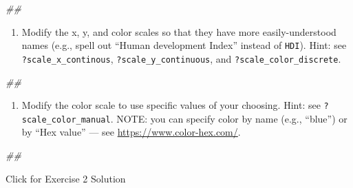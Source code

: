 \documentclass[
]{book}
\newenvironment{Shaded}{\begin{snugshade}}{\end{snugshade}}
\newcommand{\CommentTok}[1]{\textcolor[rgb]{0.56,0.35,0.01}{\textit{#1}}}
\providecommand{\tightlist}{%
  \setlength{\itemsep}{0pt}\setlength{\parskip}{0pt}}
\begin{document}
\begin{Shaded}
\begin{Highlighting}[]
\CommentTok{\#\# }
\end{Highlighting}
\end{Shaded}

\begin{enumerate}
\def\labelenumi{\arabic{enumi}.}
\setcounter{enumi}{1}
\tightlist
\item
  Modify the x, y, and color scales so that they have more easily-understood names (e.g., spell out ``Human development Index'' instead of \texttt{HDI}). Hint: see \texttt{?scale\_x\_continous}, \texttt{?scale\_y\_continuous}, and \texttt{?scale\_color\_discrete}.
\end{enumerate}

\begin{Shaded}
\begin{Highlighting}[]
\CommentTok{\#\# }
\end{Highlighting}
\end{Shaded}

\begin{enumerate}
\def\labelenumi{\arabic{enumi}.}
\setcounter{enumi}{2}
\tightlist
\item
  Modify the color scale to use specific values of your choosing. Hint: see \texttt{?scale\_color\_manual}. NOTE: you can specify color by name (e.g., ``blue'') or by ``Hex value'' --- see \url{https://www.color-hex.com/}.
\end{enumerate}

\begin{Shaded}
\begin{Highlighting}[]
\CommentTok{\#\# }
\end{Highlighting}
\end{Shaded}

{Click for Exercise 2 Solution}
\end{document}
